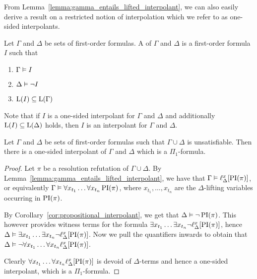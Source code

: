 From Lemma~\ref{lemma:gamma_entails_lifted_interpolant}, we can also easily derive a result on a restricted notion of interpolation which we refer to as one-sided interpolants. 

\begin{defi}
	Let $\Gamma$ and $\Delta$ be sets of first-order formulas.
	A  of $\Gamma$ and $\Delta$ is a first-order formula $I$ such that
	\begin{enumerate}
		\item $\Gamma \vDash I$
		\item $\Delta \vDash \lnot I$
		\item $\operatorname{L}(I) \subseteq \operatorname{L}(\Gamma) $
			\qedhere
	\end{enumerate}
\end{defi}

Note that if $I$ is a one-sided interpolant for $\Gamma$ and $\Delta$ and additionally $\operatorname{L}(I) \subseteq \operatorname{L}(\Delta)$ holds, then $I$ is an interpolant for $\Gamma$ and $\Delta$.

\begin{prop}
	Let $\Gamma$ and $\Delta$ be sets of first-order formulas such that $\Gamma\cup\Delta$ is unsatisfiable.
	Then there is a one-sided interpolant of $\Gamma$ and $\Delta$ which is a $\Pi_1$-formula.
\end{prop}
\begin{proof}
	Let $\pi$ be a resolution refutation of $\Gamma\cup\Delta$.
	By Lemma~\ref{lemma:gamma_entails_lifted_interpolant}, we have that
	$ \Gamma \vDash \ell_{\Delta}^{x}[\operatorname{PI}(\pi)]$,
	or equivalently
	$\Gamma \vDash \forall x_{t_1} \dots \forall x_{t_n}  \operatorname{PI}(\pi)$, where $x_{t_1}, \dots, x_{t_n}$ are the $\Delta$-lifting variables occurring in $\operatorname{PI}(\pi)$.

	By Corollary~\ref{cor:propositional_interpolant}, we get that
	$\Delta \vDash \lnot \operatorname{PI}(\pi)$.
	This however provides witness terms for the formula
	$\exists x_{t_1} \dots \exists x_{t_n} \lnot \ell_{\Delta}^{x}[ \operatorname{PI}(\pi) ]$, hence
	$\Delta \vDash \exists x_{t_1} \dots \exists x_{t_n} \lnot \ell_{\Delta}^{x}[ \operatorname{PI}(\pi) ]$. Now we pull the quantifiers inwards to obtain that
	$\Delta \vDash \lnot  \forall x_{t_1} \dots \forall x_{t_n} \ell_{\Delta}^{x}[ \operatorname{PI}(\pi) ]$.

	Clearly $\forall x_{t_1} \dots \forall x_{t_n} \ell_{\Delta}^{x}[ \operatorname{PI}(\pi) ]$ is devoid of $\Delta$-terms and hence a one-sided interpolant, which is a $\Pi_1$-formula.
\end{proof}


